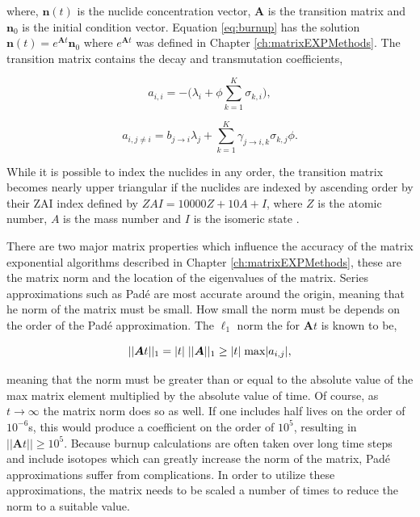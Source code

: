 \noindent where, $\boldsymbol{n}(t)$ is the nuclide concentration vector, $\boldsymbol{A}$ is the transition matrix and $\boldsymbol{n}_{0}$ is the initial condition vector. Equation \ref{eq:burnup} has the solution $\boldsymbol{n}(t) = e^{\boldsymbol{A}t}\boldsymbol{n}_{0}$ where $e^{\boldsymbol{A}t}$ was defined in Chapter \ref{ch:matrixEXPMethods}. The transition matrix contains the decay and transmutation coefficients, 

\begin{equation}
    a_{i,i} = -\bigg(\lambda_{i} + \phi\sum_{k=1}^{K} \sigma_{k,i}\bigg),
    \label{eq:diagonalCoeffsTraditionalBurnup}
\end{equation}

\begin{equation}
    a_{i,j\neq i} = b_{j\rightarrow i}\lambda_{j} + 
    \sum_{k=1}^{K}\gamma_{j\rightarrow i,k}\sigma_{k,j}\phi.
    \label{eq:offdiagonalCoeffsTraditionalBurnup}
\end{equation}

\noindent While it is possible to index the nuclides in any order, the transition matrix becomes nearly upper triangular if the nuclides are indexed by ascending order by their ZAI index defined by $ZAI = 10000Z + 10A + I$, where $Z$ is the atomic number, $A$ is the mass number and $I$ is the isomeric state \cite{pusa2013}.

There are two major matrix properties which influence the accuracy of the matrix exponential algorithms described in Chapter \ref{ch:matrixEXPMethods}, these are the matrix norm and the location of the eigenvalues of the matrix. Series approximations such as Pad\'e are most accurate around the origin, meaning that he norm of the matrix must be small. How small the norm must be depends on the order of the Pad\'e approximation. The $\ell_{1}$ norm the for $\boldsymbol{A}t$ is known to be,

\begin{equation}
    ||\boldsymbol{A}t||_{1} = |t|\hspace{1mm}||\boldsymbol{A}||_{1} \geq |t|\hspace{1mm}\text{max}|a_{i,j}|, 
\end{equation}

\noindent meaning that the norm must be greater than or equal to the absolute value of the max matrix element multiplied by the absolute value of time. Of course, as $t \rightarrow \infty$ the matrix norm does so as well. If one includes half lives on the order of $10^{-6}$s, this would produce a coefficient on the order of $10^{5}$, resulting in $||\boldsymbol{A}t|| \geq 10^{5}$. Because burnup calculations are often taken over long time steps and include isotopes which can greatly increase the norm of the matrix, Pad\'e approximations suffer from complications. In order to utilize these approximations, the matrix needs to be scaled a number of times to reduce the norm to a suitable value. 

